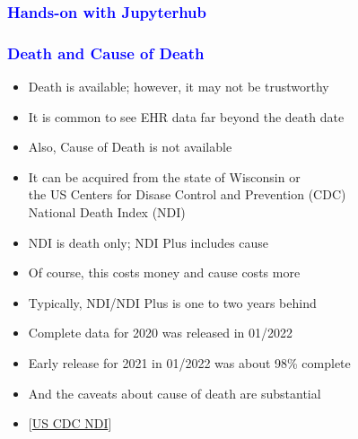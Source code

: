 \documentclass[11pt,pdftex,dvipsnames,usenames]{beamer}
\begin{document}
\begin{frame}[fragile]\frametitle{\bf\textcolor{blue}{Hands-on with Jupyterhub}}

\end{frame}

\begin{frame}[fragile]\frametitle{\bf\textcolor{blue}{Death and Cause
      of Death}}

\begin{itemize}
\item Death is available; however, it may not be trustworthy
\item It is common to see EHR data far beyond the death date
\item Also, Cause of Death is not available
\item It can be acquired from the state of Wisconsin or\\
the US Centers for Disase Control and Prevention (CDC) \\ 
National Death Index (NDI)
\item NDI is death only; NDI Plus includes cause %
\item Of course, this costs money and cause costs more
\item Typically, NDI/NDI Plus is one to two years behind
\item Complete data for 2020 was released in 01/2022
\item Early release for 2021 in 01/2022 was about 98\% complete 
\item And the caveats about cause of death are substantial
\item \textcolor{PineGreen}{[\href{https://www.cdc.gov/nchs/ndi/index.htm}
{US CDC NDI}]}
\end{itemize}

\end{frame}
\end{document}
